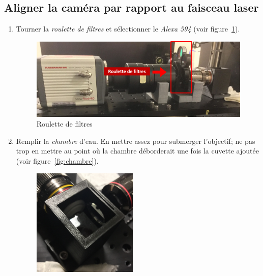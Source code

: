 \subsection{Aligner la caméra par rapport au faisceau laser}
\label{ssec:aligner_la_cam}
\begin{enumerate}
    \item Tourner la \textit{roulette de filtres} et sélectionner le \textit{Alexa 594} (voir figure~\ref{fig:filtres}).
        \begin{figure}[H]
        \centering
        \includegraphics[width=15cm]{filtres.png}
        \caption{Roulette de filtres}
            \begin{footnotesize}  \end{footnotesize}
        \label{fig:filtres}
        \end{figure}
    \item Remplir la \textit{chambre} d'eau. En mettre assez pour submerger l'objectif; ne pas trop en mettre au point où la chambre déborderait une fois la cuvette ajoutée (voir figure~\ref{fig:chambre}).
        \begin{figure}[H]
        \centering
        \includegraphics[width=5cm]{chambre.jpg}

\end{figure}
\end{enumerate}
